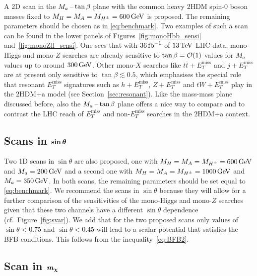 \documentclass[a4paper, 11pt,notoc]{article}
\newcommand{\MET}{\ensuremath{E_T^\mathrm{miss}}\xspace}
\newcommand{\mA}{\ensuremath{M_{A}}\xspace}
\newcommand{\ma}{\ensuremath{M_{a}}\xspace}
\newcommand{\mH}{\ensuremath{M_{H}}\xspace}
\newcommand{\mHc}{\ensuremath{M_{H^{\pm}}}\xspace}
\newcommand{\hdma}{\ensuremath{\textrm{2HDM+a}}\xspace}
\def\bm#1{\mbox{\boldmath$#1$\unboldmath}}
\begin{document}
A 2D scan in the  $\ma\hspace{0.5mm}$--$\hspace{0.5mm} \tan \beta$ plane with  the common heavy 2HDM  spin-0 boson  masses fixed to $\mH = \mA = \mHc = 600 \, {\rm GeV}$ is proposed.  The remaining parameters should be chosen as in \eqref{eq:benchmark}. Two examples of such a scan can be found in the lower panels of Figures~\ref{fig:monoHbb_sensi} and~\ref{fig:monoZll_sensi}. One sees that with $36 \, {\rm fb}^{-1}$ of $13 \, {\rm TeV}$ LHC data, mono-Higgs and mono-$Z$ searches are already sensitive to $\tan \beta = {\cal O} (1)$ values for $M_a$ values up to around $300 \, {\rm GeV}$. Other mono-$X$ searches like $t \bar t +\MET$ and $j + \MET$ are at present only sensitive to $\tan \beta \lesssim 0.5$, which emphasises the special role that  resonant $\MET$ signatures such as $h + \MET$, $Z + \MET$ and $tW + \MET$ play in the \hdma model (see Section~\ref{sec:resonant}). Like  the mass-mass plane discussed before, also the $\ma\hspace{0.5mm}$--$\hspace{0.5mm} \tan \beta$ plane offers a nice way to compare and to contrast the LHC reach of $\MET$ and non-$\MET$ searches in the \hdma context. 

\subsection*{Scans in $\bm{\sin \theta}$}

Two 1D  scans in $\sin \theta$ are also proposed, one with $\mH = \mA = \mHc = 600 \, {\rm GeV}$ and $\ma = 200 \, {\rm GeV}$ and a second one with $\mH = \mA = \mHc = 1000 \, {\rm GeV}$ and $\ma = 350 \, {\rm GeV}$. In both scans, the remaining parameters should be set equal to \eqref{eq:benchmark}.  We recommend the scans in $\sin \theta$ because they will  allow for a further comparison of the sensitivities of the mono-Higgs and mono-$Z$ searches given that these two channels have a different $\sin \theta$ dependence (cf.~Figure~\ref{fig:svar}).  We add that for the two proposed scans only values of $\sin \theta < 0.75$ and $\sin \theta < 0.45$ will lead to a scalar potential that satisfies the BFB conditions. This follows from the inequality~\eqref{eq:BFB2}.

\subsection*{Scan in $\bm{m_\chi}$}
\end{document}
